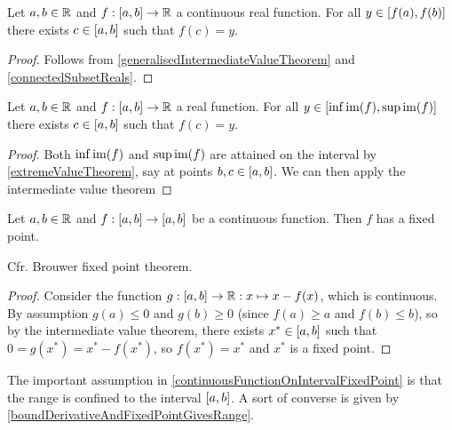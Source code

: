\begin{proposition} \label{intermediateValueTheorem}
Let $a,b\in \mathbb{R}$ and $f:\interval{a,b}\to \R$ a continuous real function. For all $y\in \interval{f(a), f(b)}$ there exists $c\in \interval{a,b}$ such that $f(c) = y$.
\end{proposition}
\begin{proof}
Follows from \ref{generalisedIntermediateValueTheorem} and \ref{connectedSubsetReals}.
\end{proof}
\begin{corollary} \label{extremaIntermediateValueTheorem}
Let $a,b\in \mathbb{R}$ and $f:\interval{a,b}\to \R$ a real function. For all $y\in \interval{\inf\im(f), \sup\im(f)}$ there exists $c\in \interval{a,b}$ such that $f(c) = y$.
\end{corollary}
\begin{proof}
Both $\inf\operatorname{im}(f)$ and $\sup\operatorname{im}(f)$ are attained on the interval by \ref{extremeValueTheorem}, say at points $b,c\in \interval{a,b}$. We can then apply the intermediate value theorem 
\end{proof}
\begin{corollary} \label{continuousFunctionOnIntervalFixedPoint}
Let $a,b\in \mathbb{R}$ and $f:\interval{a,b}\to \interval{a,b}$ be a continuous function. Then $f$ has a fixed point.
\end{corollary}
Cfr. Brouwer fixed point theorem.
\begin{proof}
Consider the function $g: \interval{a,b} \to \R: x\mapsto x - f(x)$, which is continuous. By assumption $g(a) \leq 0$ and $g(b)\geq 0$ (since $f(a) \geq a$ and $f(b)\leq b$), so by the intermediate value theorem, there exists $x^* \in \interval{a,b}$ such that $0 = g(x^*) = x^* - f(x^*)$, so $f(x^*) = x^*$ and $x^*$ is a fixed point.
\end{proof}
The important assumption in \ref{continuousFunctionOnIntervalFixedPoint} is that the range is confined to the interval $\interval{a,b}$. A sort of converse is given by \ref{boundDerivativeAndFixedPointGivesRange}.


